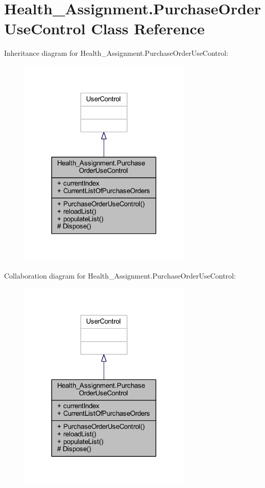 \hypertarget{class_health___assignment_1_1_purchase_order_use_control}{}\section{Health\+\_\+\+Assignment.\+Purchase\+Order\+Use\+Control Class Reference}
\label{class_health___assignment_1_1_purchase_order_use_control}


Inheritance diagram for Health\+\_\+\+Assignment.\+Purchase\+Order\+Use\+Control\+:\nopagebreak
\begin{figure}[H]
\begin{center}
\leavevmode
\includegraphics[width=233pt]{class_health___assignment_1_1_purchase_order_use_control__inherit__graph}
\end{center}
\end{figure}


Collaboration diagram for Health\+\_\+\+Assignment.\+Purchase\+Order\+Use\+Control\+:\nopagebreak
\begin{figure}[H]
\begin{center}
\leavevmode
\includegraphics[width=233pt]{class_health___assignment_1_1_purchase_order_use_control__coll__graph}
\end{center}
\end{figure}
